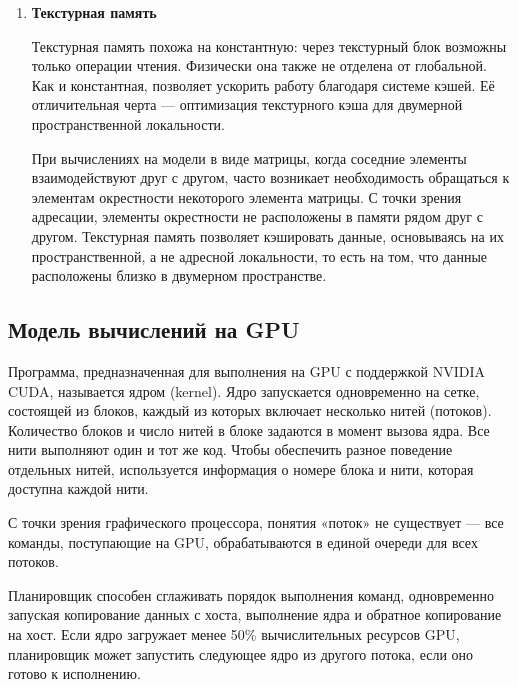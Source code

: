 \documentclass{article}[14pt]
\begin{document}
\begin{enumerate}
Константная память хранит неизменяемые данные, доступные на уровне всей сетки (grid). Её объём составляет 64 КБ, и физически она не отделена 
от глобальной памяти. Однако благодаря использованию кэшей и механизма широковещательной рассылки (broadcast) этот тип памяти может повысить 
производительность за счёт снижения трафика между процессором и памятью. Из-за небольшого объёма в ней имеет смысл размещать лишь небольшое 
количество часто используемых данных.

\item \textbf{Текстурная память}

Текстурная память похожа на константную: через текстурный блок возможны только операции чтения. Физически она также не отделена от глобальной. 
Как и константная, позволяет ускорить работу благодаря системе кэшей. Её отличительная черта — оптимизация текстурного кэша для двумерной 
пространственной локальности.

При вычислениях на модели в виде матрицы, когда соседние элементы взаимодействуют друг с другом, часто возникает необходимость обращаться к 
элементам окрестности некоторого элемента матрицы. С точки зрения адресации, элементы окрестности не расположены в памяти рядом друг с другом. 
Текстурная память позволяет кэшировать данные, основываясь на их пространственной, а не адресной локальности, то есть на том, что данные 
расположены близко в двумерном пространстве.

\end{enumerate}

\subsection{Модель вычислений на GPU}

Программа, предназначенная для выполнения на GPU с поддержкой NVIDIA CUDA, называется ядром (kernel). Ядро запускается одновременно на сетке, 
состоящей из блоков, каждый из которых включает несколько нитей (потоков). Количество блоков и число нитей в блоке задаются в момент вызова 
ядра. Все нити выполняют один и тот же код. Чтобы обеспечить разное поведение отдельных нитей, используется информация о номере блока и нити, 
которая доступна каждой нити.

С точки зрения графического процессора, понятия «поток» не существует — все команды, поступающие на GPU, обрабатываются в единой очереди для 
всех потоков.

Планировщик способен сглаживать порядок выполнения команд, одновременно запуская копирование данных с хоста, выполнение ядра и обратное 
копирование на хост. Если ядро загружает менее 50\% вычислительных ресурсов GPU, планировщик может запустить следующее ядро из другого потока, 
если оно готово к исполнению.
\end{document}
